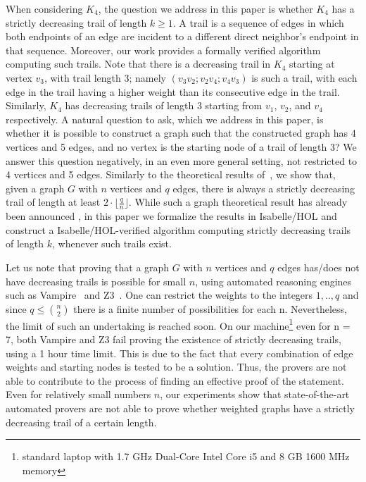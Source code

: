 \begin{isabellebody}
\begin{isamarkuptext}
\noindent When considering $K_4$, the question we address in this paper is whether $K_4$ has a 
strictly decreasing trail of length $k\geq 1$. A trail is a sequence of edges in which both endpoints of 
an edge are incident to a different direct neighbor's endpoint in that sequence.
Moreover, our work provides a formally verified algorithm 
computing such trails. Note that there is a decreasing trail in $K_4$ starting at vertex $v_3$, 
with trail length 3; namely $(v_3v_2; v_2v_4; v_4v_3)$ is such a trail, with each edge in the trail having 
a higher weight than its consecutive edge in the trail. Similarly, $K_4$ has decreasing trails of 
length 3 starting from $v_1$, $v_2$, and $v_4$ respectively. A natural question to ask,
which we address in this paper, is whether it is possible to construct a graph such that the 
 constructed graph has 4 vertices and 5 edges, and no vertex is the starting node of a trail of 
length 3? We answer this question negatively, in an even more general setting,  not restricted to 4 
vertices and 5 edges. Similarly to the theoretical results of~\cite{graham1973increasing}, we show 
that, given a graph $G$ with $n$ vertices and $q$ edges, there is always a strictly decreasing trail of length at least
$2 \cdot \lfloor\frac{q}{n}\rfloor$. While such a graph theoretical result has already been announced 
\cite{graham1973increasing}, in this paper we formalize the results in Isabelle/HOL and construct 
a Isabelle/HOL-verified algorithm computing strictly decreasing trails of length $k$, whenever such trails exist.

Let us note that proving that a
 graph $G$ with $n$ vertices and $q$ edges has/does not have decreasing trails is possible for small 
$n$, using automated reasoning engines such as Vampire~\cite{Vampire13} and Z3~\cite{de2008z3}. 
One can restrict the weights to the integers $1,..,q$ and since $q \le {n \choose 2}$ there is a 
finite number of possibilities for each n. 
Nevertheless, the limit of such an undertaking is
reached soon. On our machine\footnote{standard laptop with
1.7 GHz Dual-Core Intel Core i5 and  8 GB 1600 MHz memory} even for n = 7, both Vampire and Z3 fail 
proving the existence of strictly decreasing trails, using a 1 hour time limit. This
is due to the fact that every combination of edge weights and starting nodes is
tested to be a solution. Thus, the provers are not able to contribute to the process of finding an 
effective proof of the statement. Even for relatively small numbers $n$, our experiments show that 
state-of-the-art automated  provers are not able to prove whether weighted graphs have a strictly decreasing trail 
of a certain length.


\end{isamarkuptext}
\end{isabellebody}
